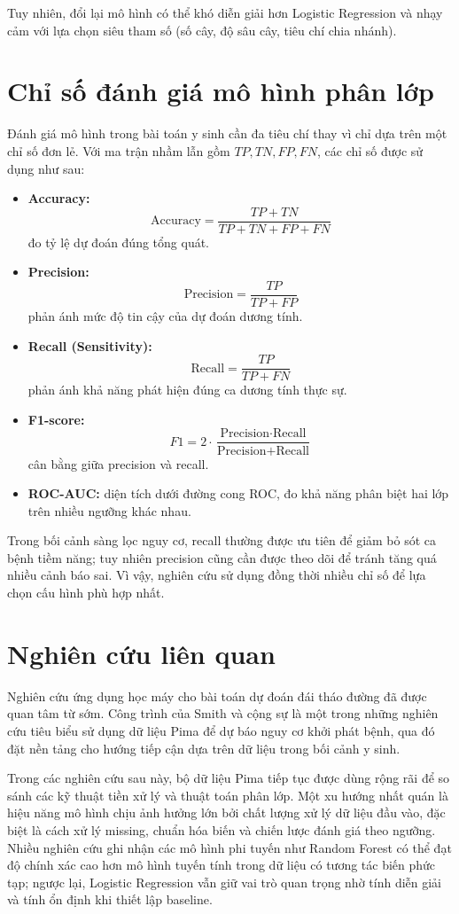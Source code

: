 Tuy nhiên, đổi lại mô hình có thể khó diễn giải hơn Logistic Regression và nhạy cảm với lựa chọn siêu tham số
(số cây, độ sâu cây, tiêu chí chia nhánh).

\section{Chỉ số đánh giá mô hình phân lớp}
Đánh giá mô hình trong bài toán y sinh cần đa tiêu chí thay vì chỉ dựa trên một chỉ số đơn lẻ. Với ma trận nhầm lẫn gồm
\(TP, TN, FP, FN\), các chỉ số được sử dụng như sau:
\begin{itemize}[leftmargin=1.5em]
    \item \textbf{Accuracy:}
    \[
        \text{Accuracy} = \frac{TP + TN}{TP + TN + FP + FN}
    \]
    đo tỷ lệ dự đoán đúng tổng quát.
    \item \textbf{Precision:}
    \[
        \text{Precision} = \frac{TP}{TP + FP}
    \]
    phản ánh mức độ tin cậy của dự đoán dương tính.
    \item \textbf{Recall (Sensitivity):}
    \[
        \text{Recall} = \frac{TP}{TP + FN}
    \]
    phản ánh khả năng phát hiện đúng ca dương tính thực sự.
    \item \textbf{F1-score:}
    \[
        F1 = 2 \cdot \frac{\text{Precision}\cdot\text{Recall}}{\text{Precision} + \text{Recall}}
    \]
    cân bằng giữa precision và recall.
    \item \textbf{ROC-AUC:} diện tích dưới đường cong ROC, đo khả năng phân biệt hai lớp trên nhiều ngưỡng khác nhau.
\end{itemize}

Trong bối cảnh sàng lọc nguy cơ, recall thường được ưu tiên để giảm bỏ sót ca bệnh tiềm năng; tuy nhiên precision cũng cần được
theo dõi để tránh tăng quá nhiều cảnh báo sai. Vì vậy, nghiên cứu sử dụng đồng thời nhiều chỉ số để lựa chọn cấu hình phù hợp nhất.

\section{Nghiên cứu liên quan}
Nghiên cứu ứng dụng học máy cho bài toán dự đoán đái tháo đường đã được quan tâm từ sớm. Công trình của Smith và cộng sự
\cite{smith1988adap} là một trong những nghiên cứu tiêu biểu sử dụng dữ liệu Pima để dự báo nguy cơ khởi phát bệnh, qua đó đặt nền
tảng cho hướng tiếp cận dựa trên dữ liệu trong bối cảnh y sinh.

Trong các nghiên cứu sau này, bộ dữ liệu Pima tiếp tục được dùng rộng rãi để so sánh các kỹ thuật tiền xử lý và thuật toán phân lớp.
Một xu hướng nhất quán là hiệu năng mô hình chịu ảnh hưởng lớn bởi chất lượng xử lý dữ liệu đầu vào, đặc biệt là cách xử lý missing,
chuẩn hóa biến và chiến lược đánh giá theo ngưỡng. Nhiều nghiên cứu ghi nhận các mô hình phi tuyến như Random Forest có thể đạt độ chính
xác cao hơn mô hình tuyến tính trong dữ liệu có tương tác biến phức tạp; ngược lại, Logistic Regression vẫn giữ vai trò quan trọng nhờ
tính diễn giải và tính ổn định khi thiết lập baseline.

